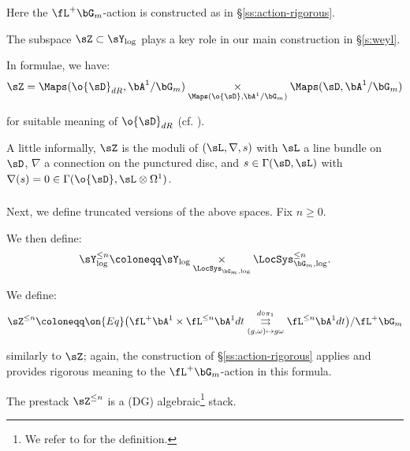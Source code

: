  Here the $\fL^+ \bG_m$-action is constructed as in
\S \ref{ss:action-rigorous}.

\begin{rem}
\notready

The subspace $\sZ \subset \sY_{\log}$ plays a key role in our
main construction in \S \ref{s:weyl}.

\end{rem}

\begin{rem}
\notready

In formulae, we have:
%
\[
\sZ = \Maps(\o{\sD}_{dR},\bA^1/\bG_m)
\underset{\Maps(\o{\sD},\bA^1/\bG_m)}{\times}
\Maps(\sD,\bA^1/\bG_m)
\]

 for suitable meaning of $\o{\sD}_{dR}$
(cf. \cite{}).

\end{rem}

\begin{rem}
\notready

A little informally, $\sZ$ is the moduli of $(\sL,\nabla,s)$ with $\sL$
a line bundle on $\sD$, $\nabla$ a connection on the punctured disc,
and $s \in \Gamma(\sD,\sL)$ with $\nabla(s) = 0 \in
\Gamma(\o{\sD},\sL \otimes \Omega^1)$.

\end{rem}


\subsubsection{}

Next, we define truncated versions of the above spaces.
Fix $n \geq 0$.

We then define:
%
\[
\sY_{\log}^{\leq n} \coloneqq \sY_{\log}
\underset{\LocSys_{\bG_m,\log}}{\times}
\LocSys_{\bG_m,\log}^{\leq n}.
\]

We define:
%
\[
\sZ^{\leq n} \coloneqq \on{Eq}
\big(\fL^+ \bA^1 \times \fL^{\leq n} \bA^1 dt
\underset{(g,\omega) \mapsto g\omega}{\overset{d\circ \pi_1}{\rightrightarrows}}
\fL^{\leq n} \bA^1 dt\big)/\fL^+ \bG_m
\]

 similarly to $\sZ$; again, the construction
of \S \ref{ss:action-rigorous} applies and provides rigorous
meaning to the $\fL^+ \bG_m$-action in this formula.

\begin{prop}
\notready\label{p:zn-algebraic}

The prestack $\sZ^{\leq n}$ is a (DG) algebraic\footnote{We refer to
\cite{dennis-dag} for the definition.} stack.

\end{prop}

